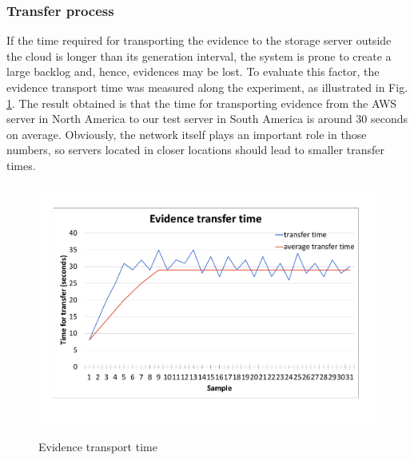 \documentclass[conference]{IEEEtran}
\newcommand{\marcos}[1]{{\color{green}{MARCOS: #1}}}
\begin{document}
\subsubsection{Transfer process}
If the time required for transporting the evidence to the storage server outside the cloud is longer than its generation interval, the system is prone to create a large backlog and, hence, evidences may be lost.
%
%
To evaluate this factor, the evidence transport time was measured along the experiment, as illustrated in Fig. \ref{fig:evidencia_transporte}.
%
The result obtained is that the time for transporting evidence from the AWS server in North America to our test server in South America is around 30 seconds on average.
%
Obviously, the network itself plays an important role in those numbers, so servers located in closer locations should lead to smaller transfer times.
%
%
%
%
%

\begin{figure}[htb!]
\footnotesize
\caption{Evidence transport time \marcos{Tranforme em pdf vetorizado. Leia: https://www.investintech.com/resources/blog/archives/8125-how-to-excel-chart-to-pdf.html}}
\includegraphics[center,scale=0.30]{evidencia_download_ieee.pdf}
\centering
\label{fig:evidencia_transporte}
\end{figure}
\end{document}
